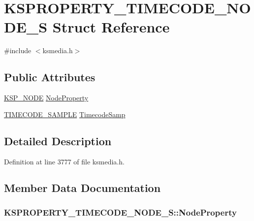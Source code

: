 \hypertarget{struct_k_s_p_r_o_p_e_r_t_y___t_i_m_e_c_o_d_e___n_o_d_e___s}{}\section{K\+S\+P\+R\+O\+P\+E\+R\+T\+Y\+\_\+\+T\+I\+M\+E\+C\+O\+D\+E\+\_\+\+N\+O\+D\+E\+\_\+S Struct Reference}
\label{struct_k_s_p_r_o_p_e_r_t_y___t_i_m_e_c_o_d_e___n_o_d_e___s}


{\ttfamily \#include $<$ksmedia.\+h$>$}

\subsection*{Public Attributes}
\begin{DoxyCompactItemize}
\item 
\hyperlink{struct_k_s_p___n_o_d_e}{K\+S\+P\+\_\+\+N\+O\+DE} \hyperlink{struct_k_s_p_r_o_p_e_r_t_y___t_i_m_e_c_o_d_e___n_o_d_e___s_abe073d037cdc8911961f094104f4f82c}{Node\+Property}
\item 
\hyperlink{ksmedia_8h_af08e714c66f0697a0eae3f8f9df70f19}{T\+I\+M\+E\+C\+O\+D\+E\+\_\+\+S\+A\+M\+P\+LE} \hyperlink{struct_k_s_p_r_o_p_e_r_t_y___t_i_m_e_c_o_d_e___n_o_d_e___s_ab95cda174a80c9d4406236ec46ba813d}{Timecode\+Samp}
\end{DoxyCompactItemize}


\subsection{Detailed Description}


Definition at line 3777 of file ksmedia.\+h.



\subsection{Member Data Documentation}
\subsubsection[{\texorpdfstring{Node\+Property}{NodeProperty}}]{ K\+S\+P\+R\+O\+P\+E\+R\+T\+Y\+\_\+\+T\+I\+M\+E\+C\+O\+D\+E\+\_\+\+N\+O\+D\+E\+\_\+\+S\+::\+Node\+Property}\hypertarget{struct_k_s_p_r_o_p_e_r_t_y___t_i_m_e_c_o_d_e___n_o_d_e___s_abe073d037cdc8911961f094104f4f82c}{}\label{struct_k_s_p_r_o_p_e_r_t_y___t_i_m_e_c_o_d_e___n_o_d_e___s_abe073d037cdc8911961f094104f4f82c}


